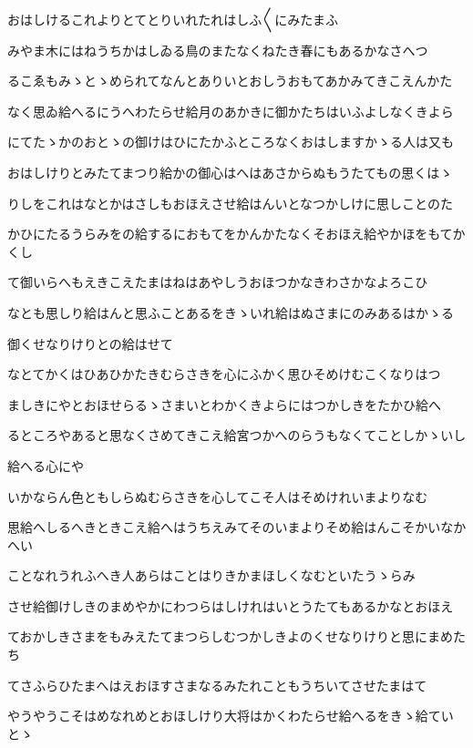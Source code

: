 \documentclass[a4paper,11pt,landscape]{ltjtarticle}
\begin{document}
\par\medskip
おはしけるこれよりとてとりいれたれはしふ〱にみたまふ
\par\medskip
みやま木にはねうちかはしゐる鳥のまたなくねたき春にもあるかなさへつ
\par\medskip
るこゑもみゝとゝめられてなんとありいとおしうおもてあかみてきこえんかた
\par\medskip
なく思ゐ給へるにうへわたらせ給月のあかきに御かたちはいふよしなくきよら
\par\medskip
にてたゝかのおとゝの御けはひにたかふところなくおはしますかゝる人は又も
\par\medskip
おはしけりとみたてまつり給かの御心はへはあさからぬもうたてもの思くはゝ
\par\medskip
りしをこれはなとかはさしもおほえさせ給はんいとなつかしけに思しことのた
\par\medskip
かひにたるうらみをの給するにおもてをかんかたなくそおほえ給やかほをもてかくし
\par\medskip
て御いらへもえきこえたまはねはあやしうおほつかなきわさかなよろこひ
\par\medskip
なとも思しり給はんと思ふことあるをきゝいれ給はぬさまにのみあるはかゝる
\par\medskip
御くせなりけりとの給はせて
\par\medskip
なとてかくはひあひかたきむらさきを心にふかく思ひそめけむこくなりはつ
\par\medskip
ましきにやとおほせらるゝさまいとわかくきよらにはつかしきをたかひ給へ
\par\medskip
るところやあると思なくさめてきこえ給宮つかへのらうもなくてことしかゝいし
\par\medskip
給へる心にや
\par\medskip
いかならん色ともしらぬむらさきを心してこそ人はそめけれいまよりなむ
\par\medskip
思給へしるへきときこえ給へはうちえみてそのいまよりそめ給はんこそかいなかへい
\par\medskip
ことなれうれふへき人あらはことはりきかまほしくなむといたうゝらみ
\par\medskip
させ給御けしきのまめやかにわつらはしけれはいとうたてもあるかなとおほえ
\par\medskip
ておかしきさまをもみえたてまつらしむつかしきよのくせなりけりと思にまめたち
\par\medskip
てさふらひたまへはえおほすさまなるみたれこともうちいてさせたまはて
\par\medskip
やうやうこそはめなれめとおほしけり大将はかくわたらせ給へるをきゝ給ていとゝ
\end{document}
